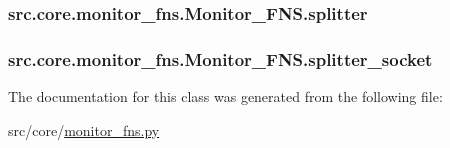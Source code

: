 \subsubsection[{splitter}]{\setlength{\rightskip}{0pt plus 5cm}src.\+core.\+monitor\+\_\+fns.\+Monitor\+\_\+\+F\+N\+S.\+splitter}\label{classsrc_1_1core_1_1monitor__fns_1_1Monitor__FNS_abf30927507278ff68690466cae9379e9}
\hypertarget{classsrc_1_1core_1_1monitor__fns_1_1Monitor__FNS_ade5cbdf60c6d114196aac3b792cbc4bc}{}
\subsubsection[{splitter\+\_\+socket}]{\setlength{\rightskip}{0pt plus 5cm}src.\+core.\+monitor\+\_\+fns.\+Monitor\+\_\+\+F\+N\+S.\+splitter\+\_\+socket}\label{classsrc_1_1core_1_1monitor__fns_1_1Monitor__FNS_ade5cbdf60c6d114196aac3b792cbc4bc}


The documentation for this class was generated from the following file\+:\begin{DoxyCompactItemize}
\item 
src/core/\hyperlink{monitor__fns_8py}{monitor\+\_\+fns.\+py}\end{DoxyCompactItemize}
